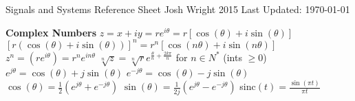 \documentclass[12pt]{article}
\begin{document}
\begin{center}
Signals and Systems Reference Sheet
\hfill \textcopyright \space Josh Wright 2015 \hfill
Last Updated: \today
\end{center}

\begin{multicols*}{2}
\begin{flushleft}
\begin{outline}[longenum]

\newlength{\upspacelength}
\setlength{\upspacelength}{0px}
\newcommand{\upspace}{\vspace{\upspacelength}}
\newcommand{\zzz}[1]{\upspace \0 \textbf{#1} }
\let\oldOne\1\let\oldTwo\2\let\oldThree\3\let\oldFour\4
\renewcommand{\1}{\upspace \oldOne  }
\renewcommand{\2}{\upspace \oldTwo  }
\renewcommand{\3}{\upspace \oldThree}
\renewcommand{\4}{\upspace \oldFour }

\small

\zzz{Complex Numbers}
  \1 $z = x+iy = re^{i\theta} = r[\cos(\theta)+i\sin(\theta)]$
  \1 $[r(\cos(\theta)+i\sin(\theta))]^n = r^n[\cos(n\theta)+i\sin(n\theta)]$
  \1 $z^n = (re^{i\theta}) = r^ne^{in\theta}$
  \1 $\sqrt[n]{z} = \sqrt[n]{r}e^{\frac{\theta}{n}+\frac{2k\pi}{n}}$ for $n\in N^*$ (ints $\geq0$)
  \1 $e^{j\theta} = \cos(\theta) + j\sin(\theta)$
  \1 $e^{-j\theta} = \cos(\theta) - j\sin(\theta)$
  \1 $\cos(\theta) = \frac{1}{2}(e^{j\theta} + e^{-j\theta})$
  \1 $\sin(\theta) = \frac{1}{2j}(e^{j\theta} - e^{-j\theta})$
  \1 
  \1 sinc$(t) = \frac{\sin(\pi t)}{\pi t}$


\end{outline}
\end{flushleft}
\end{multicols*}
\end{document}
